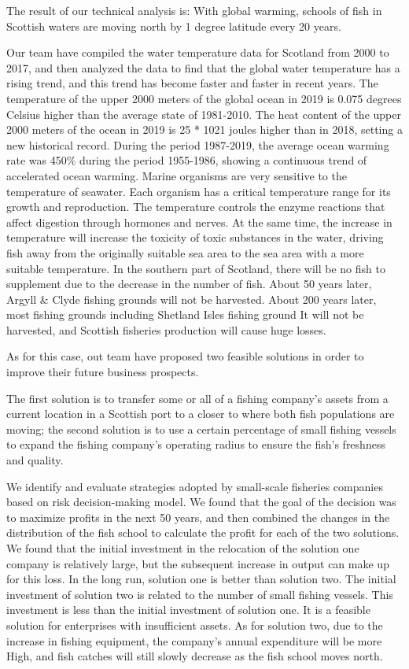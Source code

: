 \documentclass{mcmthesis}
\numberwithin{figure}{section}
\numberwithin{table}{section}
\begin{document}
The result of our technical analysis is: With global warming, schools of fish in Scottish waters are moving north by 1 degree latitude every 20 years.

Our team have compiled the water temperature data for Scotland from 2000 to 2017, and then analyzed the data to find that the global water temperature has a rising trend, and this trend has become faster and faster in recent years. The temperature of the upper 2000 meters of the global ocean in 2019 is 0.075 degrees Celsius higher than the average state of 1981-2010. The heat content of the upper 2000 meters of the ocean in 2019 is 25 * 1021 joules higher than in 2018, setting a new historical record. During the period 1987-2019, the average ocean warming rate was 450\% during the period 1955-1986, showing a continuous trend of accelerated ocean warming. Marine organisms are very sensitive to the temperature of seawater. Each organism has a critical temperature range for its growth and reproduction. The temperature controls the enzyme reactions that affect digestion through hormones and nerves. At the same time, the increase in temperature will increase the toxicity of toxic substances in the water, driving fish away from the originally suitable sea area to the sea area with a more suitable temperature. In the southern part of Scotland, there will be no fish to supplement due to the decrease in the number of fish. About 50 years later, Argyll \& Clyde fishing grounds will not be harvested. About 200 years later, most fishing grounds including Shetland Isles fishing ground It will not be harvested, and Scottish fisheries production will cause huge losses.

As for this case, out team have proposed two feasible solutions  in order to improve their future business prospects.

The first solution is to transfer some or all of a fishing company's assets from a current location in a  Scottish port to a closer to where both fish populations are moving; the second solution is to use a certain percentage of small fishing vessels to expand the fishing company's operating radius to ensure the fish's freshness and quality. 

We identify and evaluate strategies adopted by small-scale fisheries companies based on  risk decision-making model. We found that the goal of the decision was to maximize profits in the next 50 years, and then combined the changes in the distribution of the fish school to calculate the profit for each of the two solutions. We found that the initial investment in the relocation of the solution one company is relatively large, but the subsequent increase in output can make up for this loss. In the long run, solution one is better than solution two. The initial investment of solution two is related to the number of small fishing vessels. This investment is less than the initial investment of solution one. It is a feasible solution for enterprises with insufficient assets. As for solution two, due to the increase in fishing equipment, the company's annual  expenditure will be more High, and fish catches will still slowly decrease as the fish school moves north. 
\end{document}

